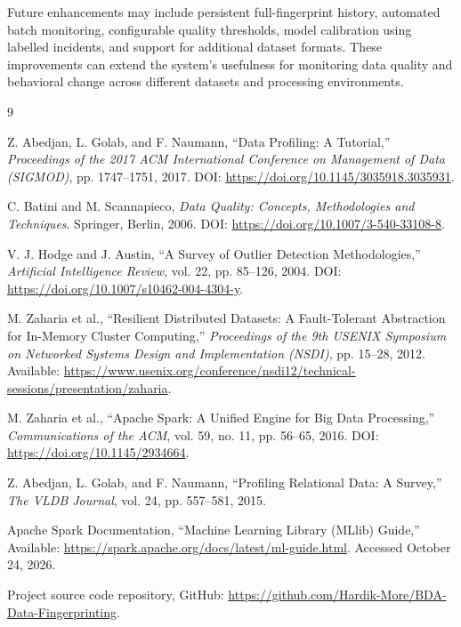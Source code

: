 \documentclass[12pt,a4paper]{report}
\begin{document}
Future enhancements may include persistent full-fingerprint history, automated batch monitoring, configurable quality thresholds, model calibration using labelled incidents, and support for additional dataset formats. These improvements can extend the system's usefulness for monitoring data quality and behavioral change across different datasets and processing environments.



\begin{thebibliography}{9}

Z. Abedjan, L. Golab, and F. Naumann,
``Data Profiling: A Tutorial,''
\textit{Proceedings of the 2017 ACM International Conference on Management of Data (SIGMOD)}, pp. 1747--1751, 2017.
DOI: \url{https://doi.org/10.1145/3035918.3035931}.

C. Batini and M. Scannapieco,
\textit{Data Quality: Concepts, Methodologies and Techniques}.
Springer, Berlin, 2006.
DOI: \url{https://doi.org/10.1007/3-540-33108-8}.

V. J. Hodge and J. Austin,
``A Survey of Outlier Detection Methodologies,''
\textit{Artificial Intelligence Review}, vol. 22, pp. 85--126, 2004.
DOI: \url{https://doi.org/10.1007/s10462-004-4304-y}.

M. Zaharia et al.,
``Resilient Distributed Datasets: A Fault-Tolerant Abstraction for In-Memory Cluster Computing,''
\textit{Proceedings of the 9th USENIX Symposium on Networked Systems Design and Implementation (NSDI)}, pp. 15--28, 2012.
Available: \url{https://www.usenix.org/conference/nsdi12/technical-sessions/presentation/zaharia}.

M. Zaharia et al.,
``Apache Spark: A Unified Engine for Big Data Processing,''
\textit{Communications of the ACM}, vol. 59, no. 11, pp. 56--65, 2016.
DOI: \url{https://doi.org/10.1145/2934664}.

Z. Abedjan, L. Golab, and F. Naumann,
``Profiling Relational Data: A Survey,''
\textit{The VLDB Journal}, vol. 24, pp. 557--581, 2015.

Apache Spark Documentation,
``Machine Learning Library (MLlib) Guide,''
Available: \url{https://spark.apache.org/docs/latest/ml-guide.html}. Accessed October 24, 2026.

Project source code repository, GitHub: \url{https://github.com/Hardik-More/BDA-Data-Fingerprinting}.

\end{thebibliography}
\end{document}
